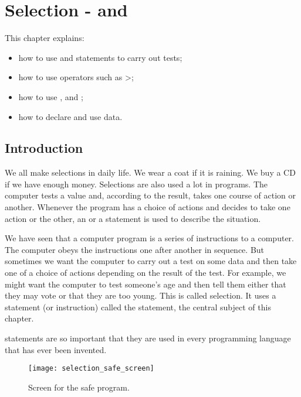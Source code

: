 \chapter{Selection -  and }
	\label{ch:selection}

	This chapter explains:
	\begin{itemize}
		\item how to use  and  statements to carry out tests;
		\item how to use operators such as >;
		\item how to use ,  and ;
		\item how to declare and use  data.
	\end{itemize}

  \section{Introduction}
		We all make selections in daily life. We wear a coat if it is raining. We buy a CD if we have enough money. Selections are also used a lot in programs. The computer tests a value and, according to the result, takes one course of action or another. Whenever the program has a choice of actions and decides to take one action or the other, an  or a  statement is used to describe the situation.

		We have seen that a computer program is a series of instructions to a computer. The computer obeys the instructions one after another in sequence. But sometimes we want the computer to carry out a test on some data and then take one of a choice of actions depending on the result of the test. For example, we might want the computer to test someone's age and then tell them either that they may vote or that they are too young. This is called selection. It uses a statement (or instruction) called the  statement, the central subject of this chapter.
		
		 statements are so important that they are used in every programming language that has ever been invented.


		\begin{figure}[th]
			\centering
			\texttt{[image: selection\_safe\_screen]}
			\caption{Screen for the safe program.}
			\label{fig:selection_safe_screen}
		\end{figure}


